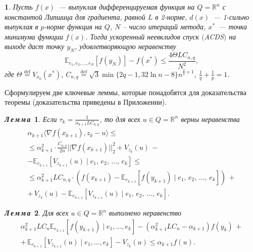 \documentclass[11pt]{article}
\newtheorem{lemma}{\hspace{\parindent}\sl{Л\,е\,м\,м\,а\,}}
\newcommand{\E}{\mathbb{E}}
\newcommand{\RR}{\mathbb{R}}
\newtheorem{TheoremNoNum}{\hspace{\parindent}{\sl Т~е~о~р~е~м~а~}}
\begin{document}
	
	\begin{TheoremNoNum}%
		Пусть $f(x)$~--- выпуклая дифференцируемая функция на $Q=\RR^n$ с константой Липшица для градиента, равной $L$ в 2-норме, $d(x)$~--- 1-сильно выпуклая в $p$-норме функция на $Q$, $N$ -- число итераций метода, $x^*$~--- точка минимума функции $f(x)$. Тогда ускоренный неевклидов спуск $($ACDS$)$ на выходе даст точку $y_N$, удовлетворяющую неравенству
		$$
		\E_{e_1,e_2,\ldots,e_N}[f(y_N)] - f(x^*) \leqslant \frac{4\Theta LC_{n,q}}{N^2},
		$$
		где $\Theta \overset{\text{def}}{=} V_{x_0}(x^*)$, $C_{n,q} \overset{\text{def}}{=} \sqrt{3}\min\{2q-1,32\ln n -8\}n^{\frac{2}{q}+1}$,  $\frac{1}{q}+\frac{1}{p}=1$.
	\end{TheoremNoNum}
	
	Сформулируем две ключевые леммы, которые понадобятся для доказательства теоремы %
	(доказательства приведены в Приложении).
	
	\begin{lemma}
		Если $\tau_{k} = \frac{1}{\alpha_{k+1}LC_{n,q}}$, то для всех $u\in Q = \RR^n$ верны неравенства
		\begin{equation}\label{grad_estimation}
					\begin{array}{l}
				\alpha_{k+1}\langle \nabla f(x_{k+1}), z_{k}-u\rangle \leqslant\\ 
				\leqslant \alpha_{k+1}^2\cdot\frac{C_{n,q}}{2n}||\nabla f(x_{k+1})||_2^2 + V_{z_k}(u) \,-\\
				- \E_{e_{k+1}}[V_{z_{k+1}}(u)\mid e_1, \, e_2, \, \ldots, \, e_k] \leqslant\\ \leqslant \alpha_{k+1}^2LC_{n,q}\cdot(f(x_{k+1}) - \E_{e_{k+1}}[f(y_{k+1})\mid e_1, \, e_2, \, \ldots, \, e_k]) \, +\\
				+ \, V_{z_k}(u) - \E_{e_{k+1}}[V_{z_{k+1}}(u)\mid e_1, \, e_2, \, \ldots, \, e_k].
			\end{array}
		\end{equation}
	\end{lemma}
	
	\begin{lemma}
		Для всех $u \in Q=\RR^n$ выполнено неравенство
		\begin{equation}\label{coupling}
			\begin{array}{l}
				\alpha_{k+1}^2 L C_n\E_{e_{k+1}}[f(y_{k+1})\mid e_1,\ldots,e_{k}] - (\alpha_{k+1}^2 L C_n-\alpha_{k+1})f(y_k) \, +\\ + \, \E_{e_{k+1}}[V_{z_{k+1}}(u)\mid e_1, \ldots, e_{k}] - V_{z_{k}}(u) \leqslant \alpha_{k+1}f(u).
			\end{array}
		\end{equation}
	\end{lemma}
	
\end{document}
